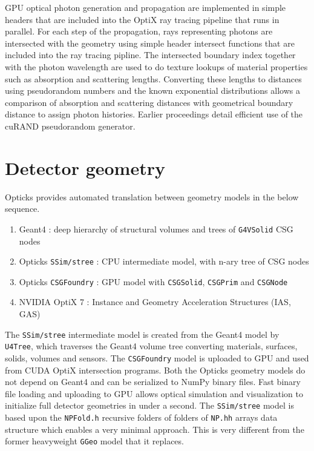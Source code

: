 \documentclass{webofc}
\begin{document}
GPU optical photon generation and propagation are implemented in simple headers that are included
into the OptiX ray tracing pipeline that runs in parallel. 
For each step of the propagation, rays representing photons are intersected
with the geometry using simple header intersect functions that are included into the ray tracing pipline.
The intersected boundary index together with the photon wavelength are used to do texture lookups of
material properties such as absorption and scattering lengths.
Converting these lengths to distances using pseudorandom numbers and 
the known exponential distributions allows a comparison of absorption and scattering distances 
with geometrical boundary distance to assign photon histories. 
Earlier proceedings\cite{chep2016} detail efficient use of the cuRAND\cite{curandURL} pseudorandom generator.
%
\section{Detector geometry} 
\label{secgeom}%
%
Opticks provides automated translation between geometry models in the below sequence. 
%
\begin{enumerate}
\item Geant4 : deep hierarchy of structural volumes and trees of {\tt G4VSolid} CSG nodes
\item Opticks {\tt SSim/stree} : CPU intermediate model, with n-ary tree of CSG nodes
\item Opticks {\tt CSGFoundry} : GPU model with {\tt CSGSolid}, {\tt CSGPrim} and {\tt CSGNode} 
\item NVIDIA OptiX 7 : Instance and Geometry Acceleration Structures (IAS, GAS)
\end{enumerate}  
%
The {\tt SSim/stree} intermediate model is created from the Geant4 model by {\tt U4Tree}, 
which traverses the Geant4 volume tree converting materials, surfaces, solids, volumes and sensors.
The {\tt CSGFoundry} model is uploaded to GPU and used from CUDA OptiX 
intersection programs. 
%
Both the Opticks geometry models do not depend on Geant4 and can be serialized to NumPy\cite{numpy} binary files. 
Fast binary file loading and uploading to GPU allows optical simulation and visualization
to initialize full detector geometries in under a second.  
%
The {\tt SSim/stree} model is based upon the {\tt NPFold.h} recursive folders of folders of
{\tt NP.hh} arrays data structure which enables a very minimal approach. This is very different 
from the former heavyweight {\tt GGeo} model that it replaces. 
%
%
\end{document}
